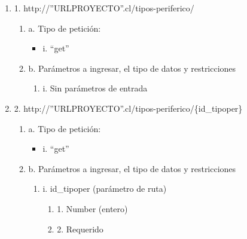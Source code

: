 \begin{enumerate}
    \item 1. http://”URLPROYECTO”.cl/tipos-periferico/
    \begin{enumerate}
        \item a. Tipo de petición:
            \begin{itemize}
               \item i. “get”
            \end{itemize}
        \item b. Parámetros a ingresar, el tipo de datos y restricciones
            \begin{enumerate}
                \item i. Sin parámetros de entrada
            \end{enumerate}
    \end{enumerate}

    \item 2. http://”URLPROYECTO”.cl/tipos-periferico/\{id\_tipoper\}
    \begin{enumerate}
        \item a. Tipo de petición:
            \begin{itemize}
               \item i. “get”
            \end{itemize}
        \item b. Parámetros a ingresar, el tipo de datos y restricciones
            \begin{enumerate}
                \item i. id\_tipoper (parámetro de ruta)
                    \begin{enumerate}
                        \item 1. Number (entero)
                        \item 2. Requerido
                    \end{enumerate}
            \end{enumerate}
    \end{enumerate}


\end{enumerate}
